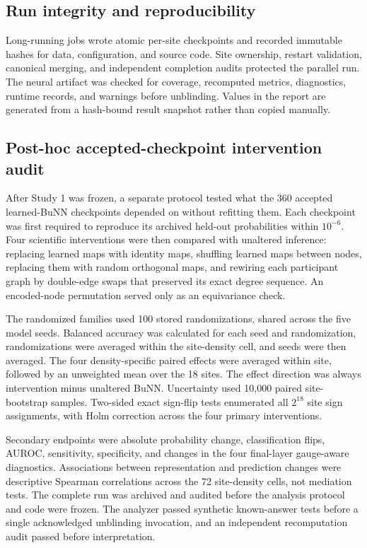 \documentclass[11pt,a4paper]{article}
\begin{document}
\subsection{Run integrity and reproducibility}

Long-running jobs wrote atomic per-site checkpoints and recorded immutable
hashes for data, configuration, and source code. Site ownership, restart
validation, canonical merging, and independent completion audits protected
the parallel run. The neural artifact was checked for coverage, recomputed
metrics, diagnostics, runtime records, and warnings before unblinding. Values
in the report are generated from a hash-bound result snapshot rather than
copied manually.

\subsection{Post-hoc accepted-checkpoint intervention audit}

After Study 1 was frozen, a separate protocol tested what the 360 accepted
learned-BuNN checkpoints depended on without refitting them. Each checkpoint
was first required to reproduce its archived held-out probabilities within
$10^{-6}$. Four scientific interventions were then compared with unaltered
inference: replacing learned maps with identity maps, shuffling learned maps
between nodes, replacing them with random orthogonal maps, and rewiring each
participant graph by double-edge swaps that preserved its exact degree
sequence. An encoded-node permutation served only as an equivariance check.

The randomized families used 100 stored randomizations, shared across the
five model seeds. Balanced accuracy was calculated for each seed and
randomization, randomizations were averaged within the site-density cell,
and seeds were then averaged. The four density-specific paired effects were
averaged within site, followed by an unweighted mean over the 18 sites. The
effect direction was always intervention minus unaltered BuNN. Uncertainty
used 10,000 paired site-bootstrap samples. Two-sided exact sign-flip tests
enumerated all $2^{18}$ site sign assignments, with Holm correction across
the four primary interventions.

Secondary endpoints were absolute probability change, classification flips,
AUROC, sensitivity, specificity, and changes in the four final-layer
gauge-aware diagnostics. Associations between representation and prediction
changes were descriptive Spearman correlations across the 72 site-density
cells, not mediation tests. The complete run was archived and audited before
the analysis protocol and code were frozen. The analyzer passed synthetic
known-answer tests before a single acknowledged unblinding invocation, and
an independent recomputation audit passed before interpretation.
\end{document}
